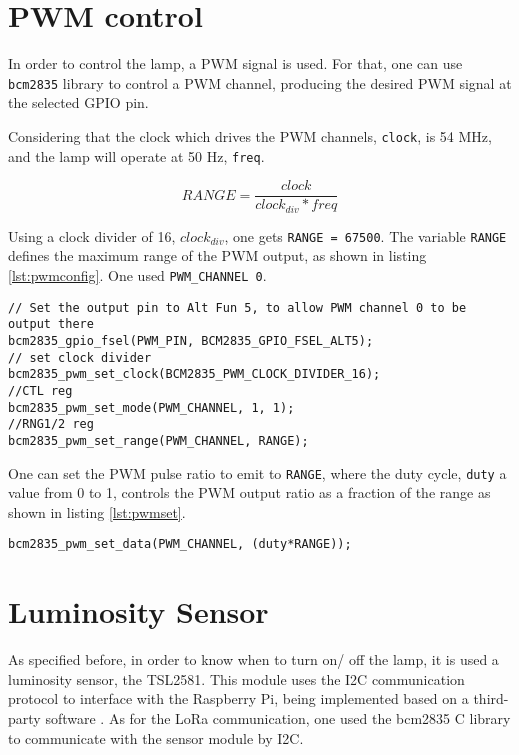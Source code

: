 \section{PWM control}
In order to control the lamp, a PWM signal is used. For that, one can use \verb|bcm2835| library to control a PWM channel, producing the desired PWM signal at the selected GPIO pin. \cite{bcmpwm}

Considering that the clock which drives the PWM channels, \verb|clock|, is 54 MHz, and the lamp will operate at 50 Hz, \verb|freq|.

\[ RANGE = \frac{clock}{clock_{div} * freq} \]

Using a clock divider of 16, $clock_{div}$, one gets \verb|RANGE = 67500|. The variable \verb|RANGE| defines the maximum range of the PWM output, as shown in listing \ref{lst:pwmconfig}. One used \verb|PWM_CHANNEL 0|.

\begin{lstlisting}[caption={PWM configuration.}, label={lst:pwmconfig}]
// Set the output pin to Alt Fun 5, to allow PWM channel 0 to be output there
bcm2835_gpio_fsel(PWM_PIN, BCM2835_GPIO_FSEL_ALT5);
// set clock divider
bcm2835_pwm_set_clock(BCM2835_PWM_CLOCK_DIVIDER_16);
//CTL reg
bcm2835_pwm_set_mode(PWM_CHANNEL, 1, 1);
//RNG1/2 reg
bcm2835_pwm_set_range(PWM_CHANNEL, RANGE);
\end{lstlisting}

One can set the PWM pulse ratio to emit to \verb|RANGE|, where the duty cycle, \verb|duty| a value from 0 to 1, controls the PWM output ratio as a fraction of the range as shown in listing \ref{lst:pwmset}.

\begin{lstlisting}[caption={PWM set duty cycle.}, label={lst:pwmset}]
bcm2835_pwm_set_data(PWM_CHANNEL, (duty*RANGE));
\end{lstlisting}

\clearpage
\section{Luminosity Sensor}
\label{section:lumSensor}
As specified before, in order to know when to turn on/ off the lamp, it is used a luminosity sensor, the TSL2581. This module uses the I2C communication protocol to interface with the Raspberry Pi, being implemented based on a third-party software \cite{tsl2581_code}. As for the LoRa communication, one used the bcm2835 C library to communicate with the sensor module by I2C. \cite{bcmpiic}


